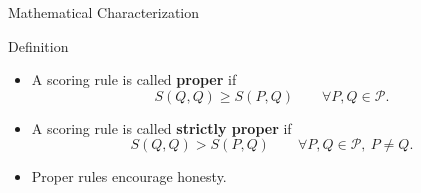 \documentclass[aspectratio=43,10pt]{beamer}
\begin{document}
\begin{frame}{Mathematical Characterization}
    \begin{block}{Definition}
        \begin{itemize}
            \item A scoring rule is called \textbf{proper} if $$S(Q, Q) \geq S(P, Q) \hspace{2em}\forall P,Q\in\mathcal{P}.$$
            \item A scoring rule is called \textbf{strictly proper} if $$S(Q, Q) > S(P, Q) \hspace{2em}\forall P,Q\in\mathcal{P},\ P\neq Q.$$
            \item Proper rules encourage honesty.
        \end{itemize}
    \end{block}
\end{frame}
\end{document}
